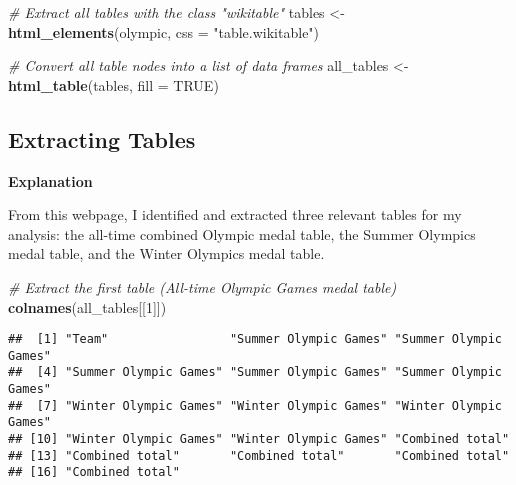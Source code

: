 \documentclass[
]{article}
\newenvironment{Shaded}{\begin{snugshade}}{\end{snugshade}}
\newcommand{\AttributeTok}[1]{\textcolor[rgb]{0.13,0.29,0.53}{#1}}
\newcommand{\CommentTok}[1]{\textcolor[rgb]{0.56,0.35,0.01}{\textit{#1}}}
\newcommand{\ConstantTok}[1]{\textcolor[rgb]{0.56,0.35,0.01}{#1}}
\newcommand{\DecValTok}[1]{\textcolor[rgb]{0.00,0.00,0.81}{#1}}
\newcommand{\FunctionTok}[1]{\textcolor[rgb]{0.13,0.29,0.53}{\textbf{#1}}}
\newcommand{\NormalTok}[1]{#1}
\newcommand{\OtherTok}[1]{\textcolor[rgb]{0.56,0.35,0.01}{#1}}
\newcommand{\StringTok}[1]{\textcolor[rgb]{0.31,0.60,0.02}{#1}}
\begin{document}
\begin{Shaded}
\begin{Highlighting}[]
\CommentTok{\# Extract all tables with the class "wikitable"}
\NormalTok{tables }\OtherTok{\textless{}{-}} \FunctionTok{html\_elements}\NormalTok{(olympic, }\AttributeTok{css =} \StringTok{"table.wikitable"}\NormalTok{)}

\CommentTok{\# Convert all table nodes into a list of data frames}
\NormalTok{all\_tables }\OtherTok{\textless{}{-}} \FunctionTok{html\_table}\NormalTok{(tables, }\AttributeTok{fill =} \ConstantTok{TRUE}\NormalTok{)}
\end{Highlighting}
\end{Shaded}

\subsection{Extracting Tables}\label{extracting-tables}

\textbf{Explanation}

From this webpage, I identified and extracted three relevant tables for
my analysis: the all-time combined Olympic medal table, the Summer
Olympics medal table, and the Winter Olympics medal table.

\begin{Shaded}
\begin{Highlighting}[]
\CommentTok{\# Extract the first table (All{-}time Olympic Games medal table)}
\FunctionTok{colnames}\NormalTok{(all\_tables[[}\DecValTok{1}\NormalTok{]])}
\end{Highlighting}
\end{Shaded}

\begin{verbatim}
##  [1] "Team"                 "Summer Olympic Games" "Summer Olympic Games"
##  [4] "Summer Olympic Games" "Summer Olympic Games" "Summer Olympic Games"
##  [7] "Winter Olympic Games" "Winter Olympic Games" "Winter Olympic Games"
## [10] "Winter Olympic Games" "Winter Olympic Games" "Combined total"      
## [13] "Combined total"       "Combined total"       "Combined total"      
## [16] "Combined total"
\end{verbatim}
\end{document}
